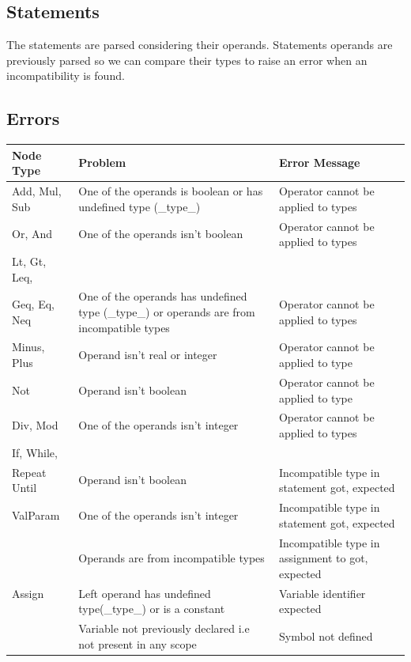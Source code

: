 \documentclass[12pt]{article}
\begin{document}
\subsection{Statements}
The statements are parsed considering their operands. Statements operands are previously parsed so we can compare their types to raise an error when an incompatibility is found.\\

\subsection{Errors}

\begin{tabularx} {\textwidth} {|l|X|X|} 
 \textbf{Node Type} 	& \textbf{Problem} & \textbf{Error Message} \\ \hline
	Add, Mul, Sub 		& One of the operands is boolean or has undefined type (\_type\_) & Operator cannot be applied to types \\ \hline
	Or, And 			& One of the operands isn't boolean & Operator cannot be applied to types \\ \hline
	Lt, Gt, Leq, \\ Geq, Eq, Neq &		One of the operands has undefined type (\_type\_) or operands are from incompatible types & Operator cannot be applied to types \\ \hline
	Minus, Plus 		& Operand isn't real or integer & Operator cannot be applied to type \\ \hline
	Not 				& Operand isn't boolean & Operator cannot be applied to type \\ \hline
	Div, Mod 			& One of the operands isn't integer & Operator cannot be applied to types \\ \hline
	If, While, \\Repeat Until & Operand isn't boolean & Incompatible type in statement got, expected \\ \hline
	ValParam 			& One of the operands isn't integer & Incompatible type in statement got, expected \\ \hline
	\multirow{3}{*}{Assign} & Operands are from incompatible types & Incompatible type in assignment to got, expected \\ \cline{2-3}
							& Left operand has undefined type(\_type\_) or is a constant & Variable identifier expected \\ \cline{2-3}
							& Variable not previously declared i.e not present in any scope & Symbol not defined \\ \hline

\end{tabularx}
\end{document}
